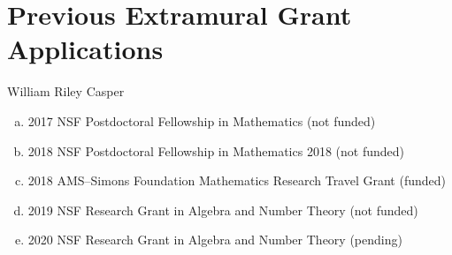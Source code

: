 \documentclass[11pt,letterpaper]{article}
\newcommand{\required}[1]{\section*{\hfil #1\hfil}}                    %
\theoremstyle{definition}
\begin{document}
\required{Previous Extramural Grant Applications}
\begin{center}
William Riley Casper
\end{center}

\begin{enumerate}[(a)]
\item  2017 NSF Postdoctoral Fellowship in Mathematics (not funded)
\item  2018 NSF Postdoctoral Fellowship in Mathematics 2018 (not funded)
\item  2018 AMS--Simons Foundation Mathematics Research Travel Grant (funded)
\item  2019 NSF Research Grant in Algebra and Number Theory (not funded)
\item  2020 NSF Research Grant in Algebra and Number Theory (pending)
\end{enumerate}
\end{document}
